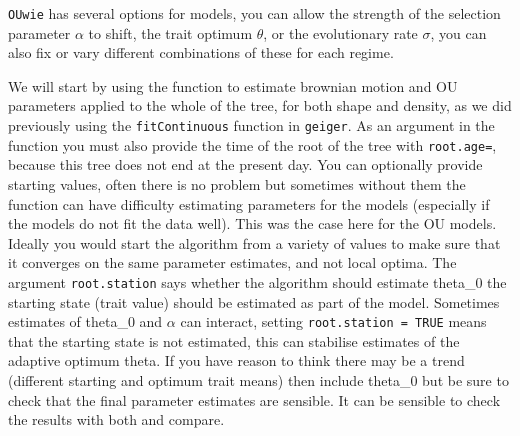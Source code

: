 \documentclass[]{article}
\newenvironment{Shaded}{\begin{snugshade}}{\end{snugshade}}
\newcommand{\KeywordTok}[1]{\textcolor[rgb]{0.13,0.29,0.53}{\textbf{#1}}}
\newcommand{\DataTypeTok}[1]{\textcolor[rgb]{0.13,0.29,0.53}{#1}}
\newcommand{\DecValTok}[1]{\textcolor[rgb]{0.00,0.00,0.81}{#1}}
\newcommand{\StringTok}[1]{\textcolor[rgb]{0.31,0.60,0.02}{#1}}
\newcommand{\CommentTok}[1]{\textcolor[rgb]{0.56,0.35,0.01}{\textit{#1}}}
\newcommand{\OtherTok}[1]{\textcolor[rgb]{0.56,0.35,0.01}{#1}}
\newcommand{\OperatorTok}[1]{\textcolor[rgb]{0.81,0.36,0.00}{\textbf{#1}}}
\newcommand{\NormalTok}[1]{#1}
\begin{document}
\begin{Shaded}
\end{Shaded}

\texttt{OUwie} has several options for models, you can allow the
strength of the selection parameter \(\alpha\) to shift, the trait
optimum \(\theta\), or the evolutionary rate \(\sigma\), you can also
fix or vary different combinations of these for each regime.

We will start by using the function to estimate brownian motion and OU
parameters applied to the whole of the tree, for both shape and density,
as we did previously using the \texttt{fitContinuous} function in
\texttt{geiger}. As an argument in the function you must also provide
the time of the root of the tree with \texttt{root.age=}, because this
tree does not end at the present day. You can optionally provide
starting values, often there is no problem but sometimes without them
the function can have difficulty estimating parameters for the models
(especially if the models do not fit the data well). This was the case
here for the OU models. Ideally you would start the algorithm from a
variety of values to make sure that it converges on the same parameter
estimates, and not local optima. The argument \texttt{root.station} says
whether the algorithm should estimate theta\_0 the starting state (trait
value) should be estimated as part of the model. Sometimes estimates of
theta\_0 and \(\alpha\) can interact, setting
\texttt{root.station\ =\ TRUE} means that the starting state is not
estimated, this can stabilise estimates of the adaptive optimum theta.
If you have reason to think there may be a trend (different starting and
optimum trait means) then include theta\_0 but be sure to check that the
final parameter estimates are sensible. It can be sensible to check the
results with both and compare.
\end{document}
